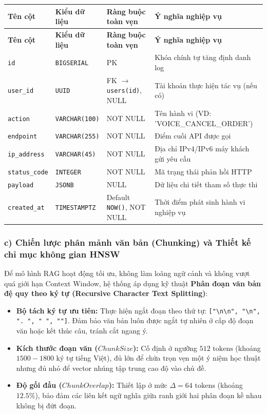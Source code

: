 \documentclass[11pt, a4paper]{report}
\begin{document}
\begin{longtable}{p{3.2cm} p{2.6cm} p{4.0cm} p{4.5cm}}
\toprule
\textbf{Tên cột} & \textbf{Kiểu dữ liệu} & \textbf{Ràng buộc toàn vẹn} & \textbf{Ý nghĩa nghiệp vụ} \\
\midrule
\endfirsthead
\toprule
\textbf{Tên cột} & \textbf{Kiểu dữ liệu} & \textbf{Ràng buộc toàn vẹn} & \textbf{Ý nghĩa nghiệp vụ} \\
\midrule
\endhead
\bottomrule
\endfoot
\texttt{id} & \texttt{BIGSERIAL} & PK & Khóa chính tự tăng định danh log \\
\midrule
\texttt{user\_id} & \texttt{UUID} & FK $\rightarrow$ \texttt{users(id)}, NULL & Tài khoản thực hiện tác vụ (nếu có) \\
\midrule
\texttt{action} & \texttt{VARCHAR(100)} & NOT NULL & Tên hành vi (VD: 'VOICE\_CANCEL\_ORDER') \\
\midrule
\texttt{endpoint} & \texttt{VARCHAR(255)} & NOT NULL & Điểm cuối API được gọi \\
\midrule
\texttt{ip\_address} & \texttt{VARCHAR(45)} & NOT NULL & Địa chỉ IPv4/IPv6 máy khách gửi yêu cầu \\
\midrule
\texttt{status\_code} & \texttt{INTEGER} & NOT NULL & Mã trạng thái phản hồi HTTP \\
\midrule
\texttt{payload} & \texttt{JSONB} & NULL & Dữ liệu chi tiết tham số thực thi \\
\midrule
\texttt{created\_at} & \texttt{TIMESTAMPTZ} & Default \texttt{NOW()}, NOT NULL & Thời điểm phát sinh hành vi nghiệp vụ \\
\bottomrule
\end{longtable}

\subsubsection{c) Chiến lược phân mảnh văn bản (Chunking) và Thiết kế chỉ mục không gian HNSW}

Để mô hình RAG hoạt động tối ưu, không làm loãng ngữ cảnh và không vượt quá giới hạn Context Window, hệ thống áp dụng kỹ thuật \textbf{Phân đoạn văn bản đệ quy theo ký tự (Recursive Character Text Splitting)}:
\begin{itemize}
    \item \textbf{Bộ tách ký tự ưu tiên:} Thực hiện ngắt đoạn theo thứ tự: \texttt{["\textbackslash n\textbackslash n", "\textbackslash n", ". ", " ", ""]}. Đảm bảo văn bản luôn được ngắt tự nhiên ở cấp độ đoạn văn hoặc kết thúc câu, tránh cắt ngang ý.
    \item \textbf{Kích thước đoạn văn ($ChunkSize$):} Cố định ở ngưỡng $512\text{ tokens}$ (khoảng $1500 - 1800$ ký tự tiếng Việt), đủ lớn để chứa trọn vẹn một ý niệm học thuật nhưng đủ nhỏ để vector nhúng tập trung cao độ vào chủ đề.
    \item \textbf{Độ gối đầu ($ChunkOverlap$):} Thiết lập ở mức $\Delta = 64\text{ tokens}$ (khoảng $12.5\%$), bảo đảm các liên kết ngữ nghĩa giữa ranh giới hai phân đoạn kề nhau không bị đứt đoạn.
\end{itemize}
\end{document}
